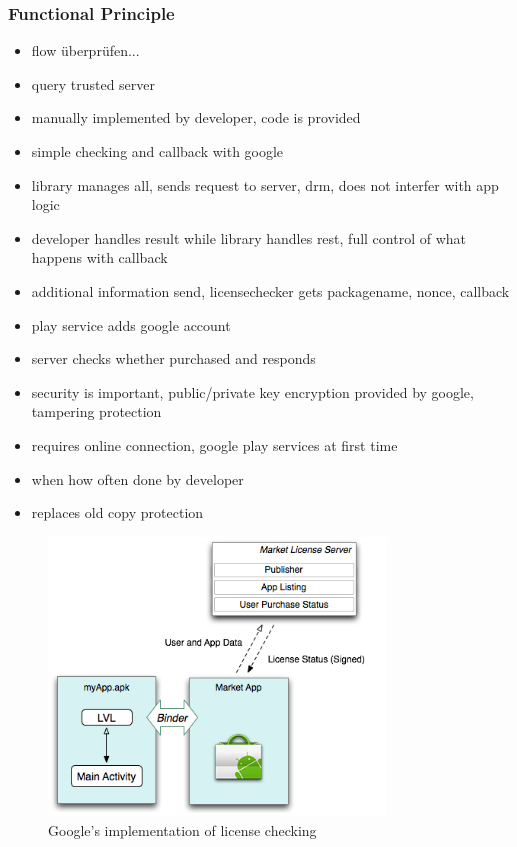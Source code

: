 \subsubsection{Functional Principle} \label{section:license-google-functional}
\begin{itemize}
  \item flow überprüfen...
    \item query trusted server
    \item manually implemented by developer, code is provided
    \item simple checking and callback with google
    \item library manages all, sends request to server, drm, does not interfer with app logic
    \item developer handles result while library handles rest, full control of what happens with callback
    \item additional information send, licensechecker gets packagename, nonce, callback
    \item play service adds google account
    \item server checks whether purchased and responds
    \item security is important, public/private key encryption provided by google, tampering protection
    \item requires online connection, google play services at first time
    \item when how often done by developer
    \item replaces old copy protection
\end{itemize}
\begin{figure}[h]
    \centering
    \includegraphics[width=0.8\textwidth]{data/lvl.png}
    \caption{Google's implementation of license checking \cite{developersLicensingOverview}}
    \label{fig:lvl}
\end{figure}

